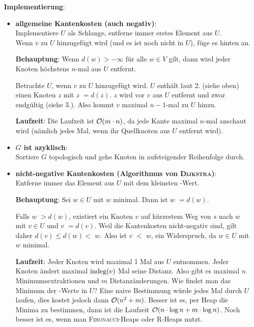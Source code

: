 \textbf{Implementierung}:
\begin{itemize}
    \item
    \textbf{allgemeine Kantenkosten (auch negativ)}: \\
    Implementiere $U$ als Schlange, entferne immer erstes Element aus $U$. \\
    Wenn $v$ zu $U$ hinzugefügt wird (und es ist noch nicht in $U$), füge es
    hinten an.

    \textbf{Behauptung}:
    Wenn $d(w) > -\infty$ für alle $w \in V$ gilt, dann wird jeder Knoten
    höchstens $n$-mal aus $U$ entfernt.
    
    \begin{Beweis}
        Betrachte $U$, wenn $v$ zu $U$ hinzugefügt wird.
        $U$ enthält laut 2. (siehe oben) einen Knoten $z$ mit
        \code{dist[}$z$\code{]} $= d(z)$.
        $z$ wird vor $v$ aus $U$ entfernt und zwar endgültig (siehe 3.).
        Also kommt $v$ maximal $n-1$-mal zu $U$ hinzu.
    \end{Beweis}
    
    \textbf{Laufzeit}:
    Die Laufzeit ist $\mathcal{O}(m \cdot n)$, da jede Kante maximal $n$-mal anschaut
    wird (nämlich jedes Mal, wenn ihr Quellknoten aus $U$ entfernt wird).
    
    \item
    \textbf{$G$ ist azyklisch}: \\
    Sortiere $G$ topologisch und gehe Knoten in aufsteigender
    Reihenfolge durch.
    
    \item
    \textbf{nicht-negative Kantenkosten (Algorithmus von \textsc{Dijkstra})}:
    \\
    Entferne immer das Element aus $U$ mit dem kleinsten -Wert.
    
    \textbf{Behauptung}:
    Sei $w \in U$ mit \code{dist[}$w$\code{]} minimal.
    Dann ist \code{dist[}$w$\code{]} $= d(w)$.
    
    \begin{Beweis}
        Falls \code{dist[}$w$\code{]} $> d(w)$, existiert ein Knoten
        $v$ auf kürzestem Weg von $s$ nach $w$ mit $v \in U$
        und \code{dist[}$v$\code{]} $= d(v)$.
        Weil die Kantenkosten nicht-negativ sind, gilt daher
        $d(v) \le d(w) <$ \code{dist[}$w$\code{]}.
        Also ist \code{dist[}$v$\code{]} $<$ \code{dist[}$w$\code{]}, ein
        Widerspruch, da $w \in U$ mit \code{dist[}$w$\code{]} minimal.
    \end{Beweis}
    
    \textbf{Laufzeit}: Jeder Knoten wird maximal 1 Mal aus $U$ entnommen.
    Jeder Knoten ändert maximal $\operatorname{indeg}(v)$ Mal seine Distanz.
    Also gibt es maximal $n$ Minimumsextraktionen und $m$ Distanzänderungen.
    Wie findet man das Minimum der -Werte in $U$?
    Eine naive Bestimmung würde jedes Mal durch $U$ laufen, dies kostet
    jedoch dann $\mathcal{O}(n^2 + m)$.
    Besser ist es, per Heap die Minima zu bestimmen, dann ist die Laufzeit
    $\mathcal{O}(n \cdot \log n + m \cdot \log n)$.
    Noch besser ist es, wenn man \textsc{Fibonacci}-Heaps oder R-Heaps nutzt.
\end{itemize}

